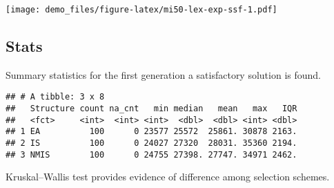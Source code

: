 \documentclass[]{book}
\newenvironment{Shaded}{\begin{snugshade}}{\end{snugshade}}
\newcommand{\CharTok}[1]{\textcolor[rgb]{0.31,0.60,0.02}{#1}}
\newcommand{\DataTypeTok}[1]{\textcolor[rgb]{0.13,0.29,0.53}{#1}}
\newcommand{\DecValTok}[1]{\textcolor[rgb]{0.00,0.00,0.81}{#1}}
\newcommand{\KeywordTok}[1]{\textcolor[rgb]{0.13,0.29,0.53}{\textbf{#1}}}
\newcommand{\NormalTok}[1]{#1}
\newcommand{\OperatorTok}[1]{\textcolor[rgb]{0.81,0.36,0.00}{\textbf{#1}}}
\newcommand{\OtherTok}[1]{\textcolor[rgb]{0.56,0.35,0.01}{#1}}
\newcommand{\StringTok}[1]{\textcolor[rgb]{0.31,0.60,0.02}{#1}}
\begin{document}
\texttt{[image: demo\_files/figure-latex/mi50-lex-exp-ssf-1.pdf]}

\hypertarget{stats-30}{%
\subsection{Stats}\label{stats-30}}

Summary statistics for the first generation a satisfactory solution is found.

\begin{Shaded}
\end{Shaded}

\begin{verbatim}
## # A tibble: 3 x 8
##   Structure count na_cnt   min median   mean   max   IQR
##   <fct>     <int>  <int> <int>  <dbl>  <dbl> <int> <dbl>
## 1 EA          100      0 23577 25572  25861. 30878 2163.
## 2 IS          100      0 24027 27320  28031. 35360 2194.
## 3 NMIS        100      0 24755 27398. 27747. 34971 2462.
\end{verbatim}

Kruskal--Wallis test provides evidence of difference among selection schemes.
\end{document}
